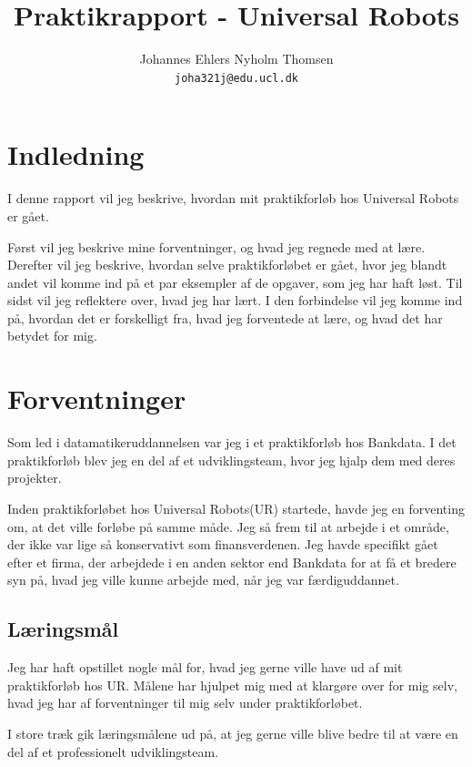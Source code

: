 \documentclass[a4paper]{article}
\title{Praktikrapport - Universal Robots}
\author
{
    Johannes Ehlers Nyholm Thomsen\\ 
    \texttt{joha321j@edu.ucl.dk}
}
\begin{document}
\maketitle

\newpage

\tableofcontents

\newpage

\section{Indledning}
I denne rapport vil jeg beskrive,
hvordan mit praktikforløb hos Universal Robots er gået.

Først vil jeg beskrive mine forventninger, og hvad jeg regnede med at lære.
Derefter vil jeg beskrive,
hvordan selve praktikforløbet er gået,
hvor jeg blandt andet vil komme ind på et par eksempler af de opgaver,
som jeg har haft løst.
Til sidst vil jeg reflektere over,
hvad jeg har lært.
I den forbindelse vil jeg komme ind på,
hvordan det er forskelligt fra,
hvad jeg forventede at lære, og hvad det har betydet for mig.

\newpage
\section{Forventninger}
Som led i datamatikeruddannelsen var jeg i et praktikforløb hos Bankdata.
I det praktikforløb blev jeg en del af et udviklingsteam,
hvor jeg hjalp dem med deres projekter.

Inden praktikforløbet hos Universal Robots(UR) startede, havde jeg en forventing om,
at det ville forløbe på samme måde.
Jeg så frem til at arbejde i et område,
der ikke var lige så konservativt som finansverdenen.
Jeg havde specifikt gået efter et firma,
der arbejdede i en anden sektor end Bankdata for at få et bredere syn på,
hvad jeg ville kunne arbejde med, når jeg var færdiguddannet.

\subsection{Læringsmål}
Jeg har haft opstillet nogle mål for, 
hvad jeg gerne ville have ud af mit praktikforløb hos UR.
Målene har hjulpet mig med at klargøre over for mig selv,
hvad jeg har af forventninger til mig selv under praktikforløbet.

I store træk gik læringsmålene ud på, 
at jeg gerne ville blive bedre til at være en del af et professionelt
udviklingsteam.
\end{document}
